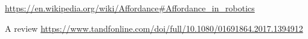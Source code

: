\documentclass[a4paper]{article}
\title{}
\date{}
\begin{document}
    \maketitle

    \url{https://en.wikipedia.org/wiki/Affordance#Affordance_in_robotics}
    
    A review
    \url{https://www.tandfonline.com/doi/full/10.1080/01691864.2017.1394912}
\end{document}
